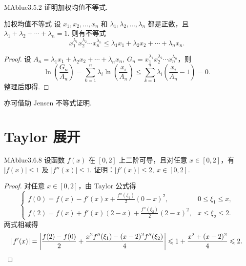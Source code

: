 \begin{problem}{MAblue}{3.5.2}
    证明加权均值不等式.
\end{problem}

\begin{center}
    \begin{minipage}{0.85\textwidth}
        \begin{theorem}{加权均值不等式}{}
            设 $x_1, x_2, \ldots, x_n$ 和 $\lambda_1, \lambda_2, \ldots, \lambda_n$ 都是正数，且 $\lambda_1 + \lambda_2 + \cdots + \lambda_n = 1$. 则有不等式
            \[
                x_1^{\lambda_1} x_2^{\lambda_2} \cdots x_n^{\lambda_n} \leqslant \lambda_1 x_1 + \lambda_2 x_2 + \cdots + \lambda_n x_n.
            \]
        \end{theorem}
    \end{minipage}
\end{center}

\begin{proof}
    设 $A_n = \lambda_1 x_1 + \lambda_2 x_2 + \cdots + \lambda_n x_n,\ G_n = x_1^{\lambda_1} x_2^{\lambda_2} \cdots x_n^{\lambda_n}$，则
    \[
        \ln\left( \frac{G_n}{A_n} \right) = \sum_{k=1}^n \lambda_i \ln\left( \frac{x_i}{A_n} \right) \leqslant \sum_{k=1}^n \lambda_i \left( \frac{x_i}{A_n} - 1 \right) = 0.
    \]
    整理后即得.
\end{proof}
{\flushleft 亦可借助 Jensen 不等式证明.}

\section{Taylor 展开}

\begin{problem}{MAblue}{3.6.8}
    设函数 $f(x)$ 在 $[0, 2]$ 上二阶可导，且对任意 $x \in [0, 2]$，有 $|f(x)| \leqslant 1$ 及 $|f''(x)| \leqslant 1$. 证明：$|f'(x)| \leqslant 2,\ x \in [0, 2]$.
\end{problem}

\begin{proof}
    对任意 $x \in [0, 2]$，由 Taylor 公式得
    \[
        \begin{cases}
            f(0) = f(x) - f'(x)x + \frac {f''(\xi_1)} 2 (0-x)^2, & 0 \leqslant \xi_1 \leqslant x, \\
            f(2) = f(x) + f'(x)(2-x) + \frac {f''(\xi_2)} 2 (2-x)^2, & x \leqslant \xi_2 \leqslant 2.
        \end{cases}
    \]
    两式相减得
    \[
        |f'(x)| = \left| \frac {f(2)-f(0)} 2 + \frac {x^2 f''(\xi_1) - (x-2)^2 f''(\xi_2)} 4 \right| \leqslant 1 + \frac{x^2 + (x-2)^2} 4 \leqslant 2. \qedhere
    \]
\end{proof}

